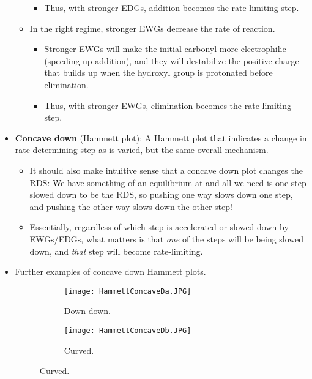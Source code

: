 \documentclass[../notes.tex]{subfiles}
\begin{document}
\begin{itemize}
\begin{itemize}
\begin{itemize}
            \item Thus, with stronger EDGs, addition becomes the rate-limiting step.
        \end{itemize}
        \item In the right regime, stronger EWGs decrease the rate of reaction.
        \begin{itemize}
            \item Stronger EWGs will make the initial carbonyl more electrophilic (speeding up addition), and they will destabilize the positive charge that builds up when the hydroxyl group is protonated before elimination.
            \item Thus, with stronger EWGs, elimination becomes the rate-limiting step.
        \end{itemize}
    \end{itemize}
    \item \textbf{Concave down} (Hammett plot): A Hammett plot that indicates a change in rate-determining step as  is varied, but the same overall mechanism.
    \begin{itemize}
        \item It should also make intuitive sense that a concave down plot changes the RDS: We have something of an equilibrium at  and all we need is one step slowed down to be the RDS, so pushing one way slows down one step, and pushing the other way slows down the other step!
        \item Essentially, regardless of which step is accelerated or slowed down by EWGs/EDGs, what matters is that \emph{one} of the steps will be being slowed down, and \emph{that} step will become rate-limiting.
    \end{itemize}
    \item Further examples of concave down Hammett plots.
    \begin{figure}[h!]
        \centering
        \begin{subfigure}[b]{0.2\linewidth}
            \centering
            \texttt{[image: HammettConcaveDa.JPG]}
            \caption{Down-down.}
            \label{fig:HammettConcaveDa}
        \end{subfigure}
        \begin{subfigure}[b]{0.2\linewidth}
            \centering
            \texttt{[image: HammettConcaveDb.JPG]}
            \caption{Curved.}
            \label{fig:HammettConcaveDb}
        \end{subfigure}

\end{figure}
\end{itemize}
\end{document}
